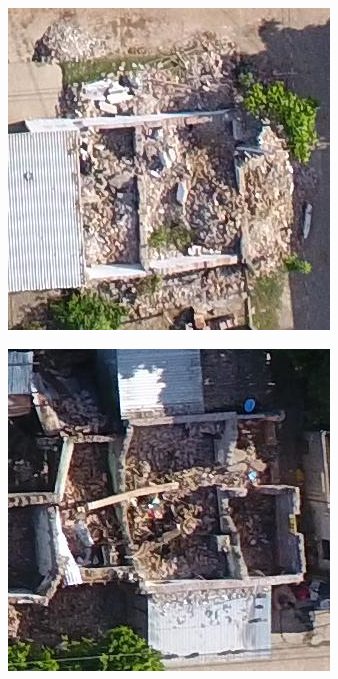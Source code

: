 \begin{figure}[!ht]
\begin{subfigure}{.24\textwidth}
    \end{subfigure}
    \begin{subfigure}{.24\textwidth}
        \includegraphics[width=\textwidth]{images/damaged5.jpg}
    \end{subfigure}
    \begin{subfigure}{.24\textwidth}
        \includegraphics[width=\textwidth]{images/damaged6.jpg}

\end{subfigure}
\end{figure}
